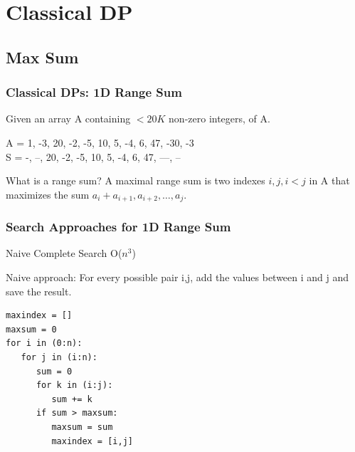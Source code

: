 \documentclass{beamer}
\begin{document}


\section{Classical DP}
\subsection{Max Sum}

\begin{frame}
  \frametitle{Classical DPs: 1D Range Sum}

  Given an array A containing $< 20K$ non-zero integers,
   of A.

  \begin{center}
    A = 1, -3, 20, -2, -5, 10, 5, -4, 6, 47, -30, -3\\
    S = -, --, \alert{20, -2, -5, 10, 5, -4, 6, 47}, ---, --
  \end{center}

  \vfill
  
  \begin{block}{What is a range sum?}
    A maximal range sum is two indexes $i,j, i < j$ in A that maximizes
    the sum $a_i + a_{i+1}, a_{i+2}, \ldots, a_j$.
  \end{block}
\end{frame}

\begin{frame}[fragile]
  \frametitle{Search Approaches for 1D Range Sum}
  \begin{block}{Naive Complete Search O($n^3$)}

    Naive approach: For every possible pair i,j, add the values
    between i and j and save the result.

{\smaller
\begin{verbatim}
maxindex = []
maxsum = 0
for i in (0:n):
   for j in (i:n):
      sum = 0
      for k in (i:j):
         sum += k
      if sum > maxsum:
         maxsum = sum
         maxindex = [i,j]
\end{verbatim}
}
  \end{block}
\end{frame}
\end{document}
